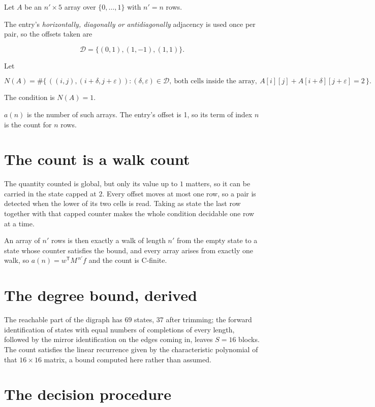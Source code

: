 \documentclass[11pt]{article}
\theoremstyle{definition}
\begin{document}
Let $A$ be an $n' \times 5$ array over $\{0,\dots,1\}$ with $n' = n$ rows.

The entry's {\itshape horizontally, diagonally or antidiagonally} adjacency is used once per pair, so the offsets taken are

\[\mathcal{D} = \{(0,1), (1,-1), (1,1)\}.\]

Let

\[N(A) = \#\bigl\{\,((i,j),(i{+}\delta,j{+}\varepsilon)) : (\delta,\varepsilon) \in \mathcal{D},\ \text{both cells inside the array},\ A[i][j] + A[i{+}\delta][j{+}\varepsilon] = 2\,\bigr\}.\]

The condition is $N(A) = 1$.

$a(n)$ is the number of such arrays. The entry's offset is 1, so its term of index $n$ is the count for $n$ rows.

\section{The count is a walk count}

The quantity counted is global, but only its value up to $1$ matters, so it can be carried in the state capped at $2$. Every offset moves at most one row, so a pair is detected when the lower of its two cells is read. Taking as state the last row together with that capped counter makes the whole condition decidable one row at a time.

An array of $n'$ rows is then exactly a walk of length $n'$ from the empty state to a state whose counter satisfies the bound, and every array arises from exactly one walk, so $a(n) = w^{\mathsf T}M^{\,n'}f$ and the count is C-finite.

\section{The degree bound, derived}

The reachable part of the digraph has $69$ states, $37$ after trimming; the forward identification of states with equal numbers of completions of every length, followed by the mirror identification on the edges coming in, leaves $S = 16$ blocks. The count satisfies the linear recurrence given by the characteristic polynomial of that $16\times16$ matrix, a bound computed here rather than assumed.

\section{The decision procedure}
\end{document}
